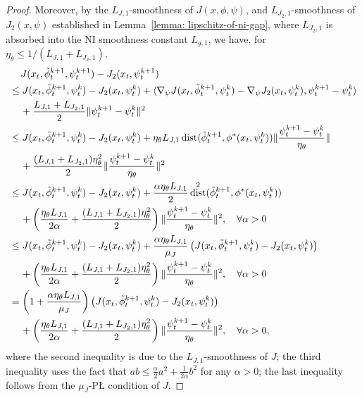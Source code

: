 \documentclass{article}
\theoremstyle{plain}
\theoremstyle{definition}
\theoremstyle{remark}
\DeclareMathOperator{\dist}{dist}
\begin{document}
\begin{proof}
    Moreover, by the $L_{J,1}$-smoothness of $J(x,\phi,\psi)$, and $L_{J_2,1}$-smoothness of $J_2(x,\psi)$ established in Lemma~\ref{lemma: lipschitz-of-ni-gap}, where $L_{J_2,1}$ is absorbed into the NI smoothness constant $L_{g,1}$, we have, for $\eta_\theta \leq 1/(L_{J,1} + L_{J_2,1})$,
    \begin{align}
        & \quad\, J(x_t,\tilde{\phi}_t^{k+1},\psi_t^{k+1}) - J_2(x_t,\psi_t^{k+1}) \notag \\
        & \leq J(x_t,\tilde{\phi}_t^{k+1},\psi_t^k) - J_2(x_t,\psi_t^k) + \langle \nabla_\psi J(x_t,\tilde{\phi}_t^{k+1},\psi_t^k) - \nabla_\psi J_2(x_t,\psi_t^k), \psi_t^{k+1} - \psi_t^{k}  \rangle \notag \\
        & \quad \, + \frac{L_{J,1} + L_{J_2,1}}{2} \| \psi_t^{k+1} - \psi_t^k \|^2 \notag\\
        & \leq J(x_t,\tilde{\phi}_t^{k+1},\psi_t^k) - J_2(x_t,\psi_t^k) + \eta_\theta L_{J,1} \dist(\tilde{\phi}_t^{k+1} ,\phi^*(x_t,\psi_t^k) )\| \frac{\psi^{k+1}_t - \psi^{k}_t}{\eta_\theta}\| \notag \\
        & \quad \, + \frac{(L_{J,1} + L_{J_2,1}) \eta_\theta^2}{2} \| \frac{\psi^{k+1}_t - \psi^{k}_t}{\eta_\theta}\|^2 \notag\\
        & \leq J(x_t,\tilde{\phi}_t^{k+1},\psi_t^k) - J_2(x_t,\psi_t^k) + \frac{\alpha \eta_\theta L_{J,1}}{2} \dist^2(\tilde{\phi}_t^{k+1} , \phi^*(x_t,\psi_t^k) ) \notag \\
        & \quad \, + \left( \frac{\eta_\theta L_{J,1}}{2\alpha}  + \frac{(L_{J,1} + L_{J_2,1}) \eta_\theta^2}{2} \right) \| \frac{\psi^{k+1}_t - \psi^{k}_t}{\eta_\theta}\|^2 , \quad \forall \alpha >0 \notag\\
        & \leq J(x_t,\tilde{\phi}_t^{k+1},\psi_t^k) - J_2(x_t,\psi_t^k) + \frac{\alpha \eta_\theta L_{J,1}}{\mu_J} \left( J(x_t,\tilde{\phi}_t^{k+1},\psi_t^k) - J_2(x_t,\psi_t^k) \right) \notag \\
        & \quad \, + \left( \frac{\eta_\theta L_{J,1}}{2\alpha}  + \frac{(L_{J,1} + L_{J_2,1}) \eta_\theta^2}{2} \right) \| \frac{\psi^{k+1}_t - \psi^{k}_t}{\eta_\theta}\|^2 , \quad \forall \alpha >0 \notag \\
        & = \left( 1 +\frac{\alpha \eta_\theta L_{J,1}}{\mu_J} \right)  \left( J(x_t,\tilde{\phi}_t^{k+1},\psi_t^k) - J_2(x_t,\psi_t^k) \right)  \notag \\
        & \quad \, + \left( \frac{\eta_\theta L_{J,1}}{2\alpha}  + \frac{(L_{J,1} + L_{J_2,1}) \eta_\theta^2}{2} \right) \| \frac{\psi^{k+1}_t - \psi^{k}_t}{\eta_\theta}\|^2, \quad \forall \alpha >0,
    \end{align}
    where the second inequality is due to the $L_{J,1}$-smoothness of $J$;   
    the third inequality uses the fact that $ab \leq \frac{\alpha}{2} a^2 + \frac{1}{2\alpha} b^2$ for any $\alpha >0$; the last inequality follows from the $\mu_J$-P{\L} condition of $J$.


\end{proof}
\end{document}
